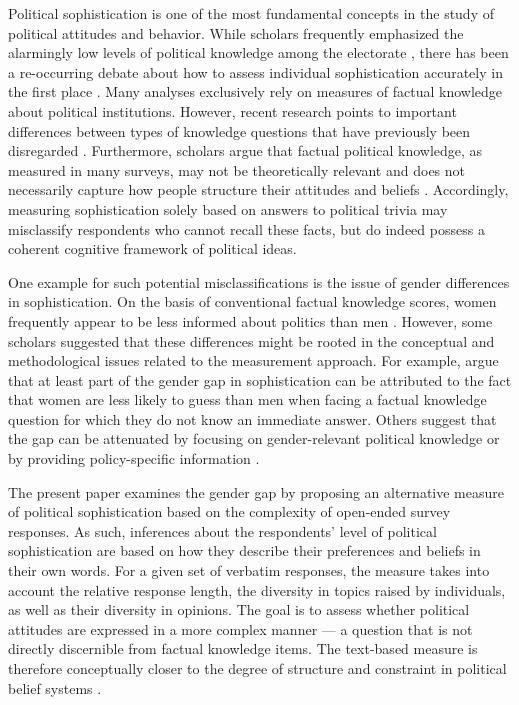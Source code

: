 \documentclass[12pt]{article}
\begin{document}
Political sophistication is one of the most fundamental concepts in the study of political attitudes and behavior. While scholars frequently emphasized the alarmingly low levels of political knowledge among the electorate \citep[e.g.,][]{converse1964nature,carpini1996americans}, there has been a re-occurring debate about how to assess individual sophistication accurately in the first place \citep[e.g.][]{mondak2000reconsidering,mondak2001asked,sturgis2008experiment,debell2013harder,pietryka2013analysis}. Many analyses exclusively rely on measures of factual knowledge about political institutions. However, recent research points to important differences between types of knowledge questions that have previously been disregarded \citep{barabas2014question}. Furthermore, scholars argue that factual political knowledge, as measured in many surveys, may not be theoretically relevant \citep{lupia2006elitism} and does not necessarily capture how people structure their attitudes and beliefs \citep[e.g.][]{luskin1987measuring}. Accordingly, measuring sophistication solely based on answers to political trivia may misclassify respondents who cannot recall these facts, but do indeed possess a coherent cognitive framework of political ideas.

One example for such potential misclassifications is the issue of gender differences in sophistication. On the basis of conventional factual knowledge scores, women frequently appear to be less informed about politics than men \citep{verba1997knowing,wolak2011roots}. However, some scholars suggested that these differences might be rooted in the conceptual and methodological issues related to the measurement approach. For example, \citet{mondak2004knowledge} argue that at least part of the gender gap in sophistication can be attributed to the fact that women are less likely to guess than men when facing a factual knowledge question for which they do not know an immediate answer. Others suggest that the gap can be attenuated by focusing on gender-relevant political knowledge \citep[e.g.,][]{dolan2011women} or by providing policy-specific information \citep[e.g.,][]{jerit2017revisiting}.

The present paper examines the gender gap by proposing an alternative measure of political sophistication based on the complexity of open-ended survey responses. As such, inferences about the respondents' level of political sophistication are based on how they describe their preferences and beliefs in their own words. For a given set of verbatim responses, the measure takes into account the relative response length, the diversity in topics raised by individuals, as well as their diversity in opinions. The goal is to assess whether political attitudes are expressed in a more complex manner --- a question that is not directly discernible from factual knowledge items. The text-based measure is therefore conceptually closer to the degree of structure and constraint in political belief systems
\citep[see for example][]{tetlock1983cognitive,luskin1987measuring}. 
\end{document}
